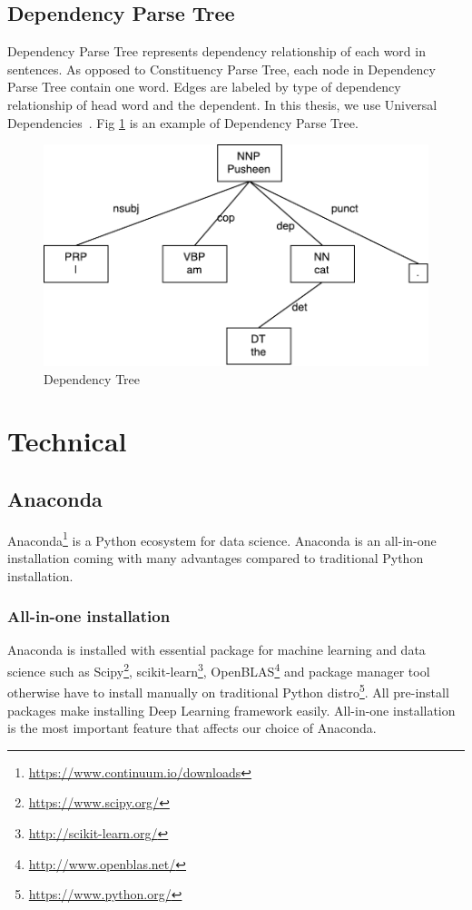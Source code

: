 \subsection{Dependency Parse Tree}
Dependency Parse Tree represents dependency relationship of each word in sentences. 
As opposed to Constituency Parse Tree, each node in Dependency Parse Tree contain one word. 
Edges are labeled by type of dependency relationship of head word and the dependent. In this thesis, we use Universal Dependencies~\cite{nivre2016universal}. Fig \ref{fig:udexample} is an example of Dependency Parse Tree.

\begin{figure}[H]
    \centering
    \includegraphics[width=0.7\linewidth]{figure/udexample}
    \caption[Dependency Tree]{Dependency Tree}
    \label{fig:udexample}
\end{figure}


\section{Technical}
\subsection{Anaconda}
Anaconda\footnote{\url{https://www.continuum.io/downloads}} is a Python ecosystem for data science. Anaconda is an all-in-one installation coming with many advantages compared to traditional Python installation.

\subsubsection{All-in-one installation}
Anaconda is installed with essential package for machine learning and data science such as Scipy\footnote{\url{https://www.scipy.org/}}, scikit-learn\footnote{\url{http://scikit-learn.org/}}, OpenBLAS\footnote{\url{http://www.openblas.net/}} and package manager tool otherwise have to install manually on traditional Python distro\footnote{\url{https://www.python.org/}}. All pre-install packages make installing Deep Learning framework easily. All-in-one installation is the most important feature that affects our choice of Anaconda.

